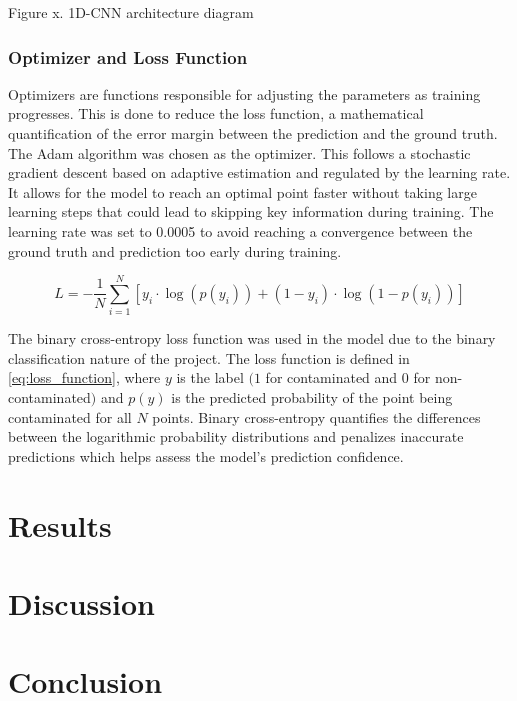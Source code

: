 \documentclass[12pt]{report}
\renewcommand{\cite}{\supercite}
\begin{document}
Figure x. 1D-CNN architecture diagram
\subsubsection{Optimizer and Loss Function}
Optimizers are functions responsible for adjusting the parameters as training progresses.\cite{eitcaacademy_2023_what} This is done to reduce the loss function, a mathematical quantification of the error margin between the prediction and the ground truth. The Adam algorithm was chosen as the optimizer. This follows a stochastic gradient descent based on adaptive estimation and regulated by the learning rate.\cite{kerasteam_keras} It allows for the model to reach an optimal point faster without taking large learning steps that could lead to skipping key information during training. The learning rate was set to 0.0005 to avoid reaching a convergence between the ground truth and prediction too early during training.

\begin{equation}
    L = -\frac{1}{N} \sum_{i=1}^{N} \left[ y_i \cdot \log(p(y_i)) + (1 - y_i) \cdot \log(1 - p(y_i)) \right]
    \label{eq:loss_function}
\end{equation}

The binary cross-entropy loss function was used in the model due to the binary classification nature of the project. The loss function is defined in \autoref{eq:loss_function}, where $y$ is the label $(1$ for contaminated and $0$ for non-contaminated$)$ and $p(y)$ is the predicted probability of the point being contaminated for all $N$ points. Binary cross-entropy quantifies the differences between the logarithmic probability distributions and penalizes inaccurate predictions which helps assess the model’s prediction confidence.

\section{Results}

\section{Discussion}

\section{Conclusion}
\end{document}
